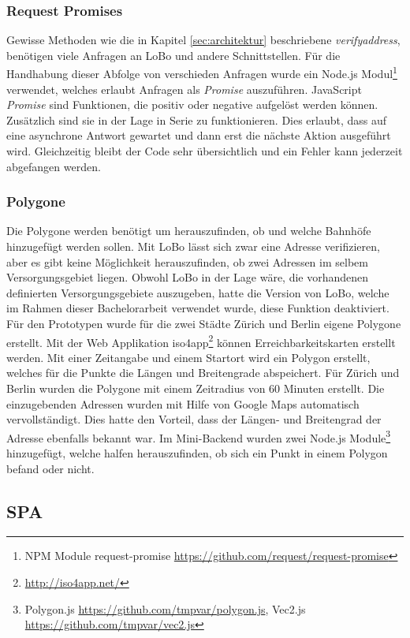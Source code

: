 \subsubsection{Request Promises}
Gewisse Methoden wie die in Kapitel \ref{sec:architektur} beschriebene \textit{verifyaddress}, benötigen viele Anfragen an LoBo und andere Schnittstellen. Für die Handhabung dieser Abfolge von verschieden Anfragen wurde ein Node.js Modul\footnote{NPM Module request-promise \url{https://github.com/request/request-promise}} verwendet, welches erlaubt Anfragen als \textit{Promise} auszuführen. JavaScript \textit{Promise} sind Funktionen, die positiv oder negative aufgelöst werden können. Zusätzlich sind sie in der Lage in Serie zu funktionieren. Dies erlaubt, dass auf eine asynchrone Antwort gewartet und dann erst die nächste Aktion ausgeführt wird. Gleichzeitig bleibt der Code sehr übersichtlich und ein Fehler kann jederzeit abgefangen werden.


\subsubsection{Polygone}
Die Polygone werden benötigt um herauszufinden, ob und welche Bahnhöfe hinzugefügt werden sollen. Mit LoBo lässt sich zwar eine Adresse verifizieren, aber es gibt keine Möglichkeit herauszufinden, ob zwei Adressen im selbem Versorgungsgebiet liegen. Obwohl LoBo in der Lage wäre, die vorhandenen definierten Versorgungsgebiete auszugeben, hatte die Version von LoBo, welche im Rahmen dieser Bachelorarbeit verwendet wurde, diese Funktion deaktiviert. Für den Prototypen wurde für die zwei Städte Zürich und Berlin eigene Polygone erstellt. Mit der Web Applikation iso4app\footnote{\url{http://iso4app.net/}} können Erreichbarkeitskarten erstellt werden. Mit einer Zeitangabe und einem Startort wird ein Polygon erstellt, welches für die Punkte die Längen und Breitengrade abspeichert. Für Zürich und Berlin wurden die Polygone mit einem Zeitradius von 60 Minuten erstellt. Die einzugebenden Adressen wurden mit Hilfe von Google Maps automatisch vervollständigt. Dies hatte den Vorteil, dass der Längen- und Breitengrad der Adresse ebenfalls bekannt war. Im Mini-Backend wurden zwei Node.js Module\footnote{Polygon.js \url{https://github.com/tmpvar/polygon.js}, Vec2.js \url{https://github.com/tmpvar/vec2.js}} hinzugefügt, welche halfen herauszufinden, ob sich ein Punkt in einem Polygon befand oder nicht.


\subsection{SPA}
